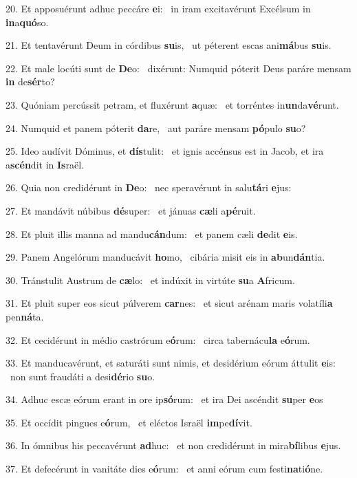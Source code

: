 20. Et apposuérunt adhuc peccáre \textbf{e}i: \ast\  in iram excitavérunt Excélsum in \textbf{in}a\textbf{quó}so.\

21. Et tentavérunt Deum in córdibus \textbf{su}is, \ast\  ut péterent escas ani\textbf{má}bus \textbf{su}is.\

22. Et male locúti sunt de \textbf{De}o: \ast\  dixérunt: Numquid póterit Deus paráre mensam \textbf{in} de\textbf{sér}to?\

23. Quóniam percússit petram, et fluxérunt \textbf{a}quæ: \ast\  et torréntes in\textbf{un}da\textbf{vé}runt.\

24. Numquid et panem póterit \textbf{da}re, \ast\  aut paráre mensam \textbf{pó}pulo \textbf{su}o?\

25. Ideo audívit Dóminus, et \textbf{dís}tulit: \ast\  et ignis accénsus est in Jacob, et ira a\textbf{scén}dit in \textbf{Is}raël.\

26. Quia non credidérunt in \textbf{De}o: \ast\  nec speravérunt in salu\textbf{tá}ri \textbf{e}jus:\

27. Et mandávit núbibus \textbf{dé}super: \ast\  et jánuas \textbf{cæ}li a\textbf{pé}ruit.\

28. Et pluit illis manna ad mandu\textbf{cán}dum: \ast\  et panem cæli \textbf{de}dit \textbf{e}is.\

29. Panem Angelórum manducávit \textbf{ho}mo, \ast\  cibária misit eis in \textbf{ab}un\textbf{dán}tia.\

30. Tránstulit Austrum de \textbf{cæ}lo: \ast\  et indúxit in virtúte \textbf{su}a \textbf{A}fricum.\

31. Et pluit super eos sicut púlverem \textbf{car}nes: \ast\  et sicut arénam maris volatíli\textbf{a} pen\textbf{ná}ta.\

32. Et cecidérunt in médio castrórum e\textbf{ó}rum: \ast\  circa tabernácu\textbf{la} e\textbf{ó}rum.\

33. Et manducavérunt, et saturáti sunt nimis, et desidérium eórum áttulit \textbf{e}is: \ast\  non sunt fraudáti a desi\textbf{dé}rio \textbf{su}o.\

34. Adhuc escæ eórum erant in ore ip\textbf{só}rum: \ast\  et ira Dei ascéndit \textbf{su}per \textbf{e}os\

35. Et occídit pingues e\textbf{ó}rum, \ast\  et eléctos Israël \textbf{im}pe\textbf{dí}vit.\

36. In ómnibus his peccavérunt \textbf{ad}huc: \ast\  et non credidérunt in mira\textbf{bí}libus \textbf{e}jus.\

37. Et defecérunt in vanitáte dies e\textbf{ó}rum: \ast\  et anni eórum cum festi\textbf{na}ti\textbf{ó}ne.\

